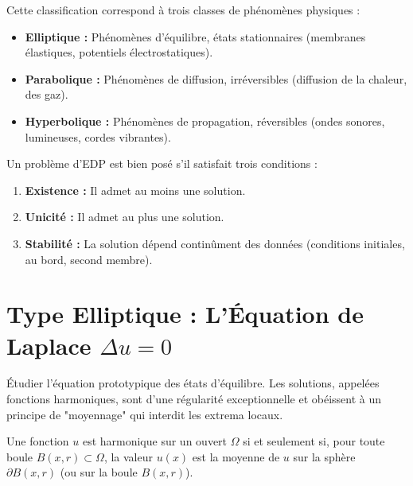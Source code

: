 \begin{remark}
    Cette classification correspond à trois classes de phénomènes physiques :
    \begin{itemize}
        \item \textbf{Elliptique :} Phénomènes d'équilibre, états stationnaires (membranes élastiques, potentiels électrostatiques).
        \item \textbf{Parabolique :} Phénomènes de diffusion, irréversibles (diffusion de la chaleur, des gaz).
        \item \textbf{Hyperbolique :} Phénomènes de propagation, réversibles (ondes sonores, lumineuses, cordes vibrantes).
    \end{itemize}
\end{remark}

\begin{definition}
    Un problème d'EDP est bien posé s'il satisfait trois conditions :
    \begin{enumerate}
        \item \textbf{Existence :} Il admet au moins une solution.
        \item \textbf{Unicité :} Il admet au plus une solution.
        \item \textbf{Stabilité :} La solution dépend continûment des données (conditions initiales, au bord, second membre).
    \end{enumerate}
\end{definition}

\section{Type Elliptique : L'Équation de Laplace $\Delta u = 0$}

\begin{objectif}
    Étudier l'équation prototypique des états d'équilibre. Les solutions, appelées fonctions harmoniques, sont d'une régularité exceptionnelle et obéissent à un principe de "moyennage" qui interdit les extrema locaux.
\end{objectif}

\begin{theorem}
    Une fonction $u$ est harmonique sur un ouvert $\Omega$ si et seulement si, pour toute boule $B(x,r) \subset \Omega$, la valeur $u(x)$ est la moyenne de $u$ sur la sphère $\partial B(x,r)$ (ou sur la boule $B(x,r)$).
\end{theorem}

